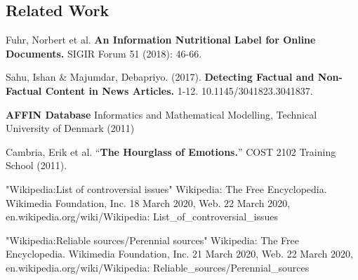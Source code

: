 \documentclass[10pt]{article}
\begin{document}
\begin{multicols}{2}

\section{Related Work}
\begin{enumerate}[label={[\arabic*]}]
\item Fuhr, Norbert et al. \grqq{}\textbf{An Information Nutritional Label for Online Documents.}\grqq{} SIGIR Forum 51 (2018): 46-66.\label{[1]}
\item Sahu, Ishan \& Majumdar, Debapriyo. (2017). \textbf{Detecting Factual and Non-Factual Content in News Articles.} 1-12. 10.1145/3041823.3041837.\label{[2]}
\item \textbf{AFFIN Database} Informatics and Mathematical Modelling, Technical University of Denmark (2011) \label{[3]}
\item Cambria, Erik et al. “\textbf{The Hourglass of Emotions.}” COST 2102 Training School (2011). \label{[4]}
\item "Wikipedia:List of controversial issues" Wikipedia: The Free Encyclopedia. Wikimedia Foundation, Inc. 18 March 2020, Web. 22 March 2020, en.wikipedia.org/wiki/Wikipedia: List\_of\_controversial\_issues \label{[5]}
\item "Wikipedia:Reliable sources/Perennial sources" Wikipedia: The Free Encyclopedia. Wikimedia Foundation, Inc. 21 March 2020, Web. 22 March 2020, en.wikipedia.org/wiki/Wikipedia: Reliable\_sources/Perennial\_sources \label{[6]}
\end{enumerate}

  


\end{multicols}
\end{document}
